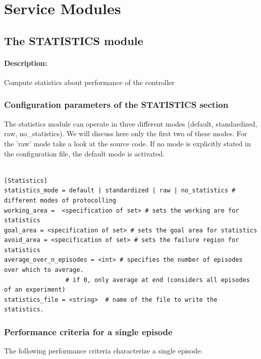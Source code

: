\documentclass[a4paper,12pt,german]{article}
\begin{document}
\section{Service Modules}

\subsection{The STATISTICS module}

\paragraph{Description:} Compute statistics about performance of the controller

\subsubsection{Configuration parameters of the STATISTICS section}
The statistics module can operate in three different modes (default, standardized, raw, no\_statistics).
We will discuss here only the first two of these modes. For the 'raw' mode take a look at the source code.
If no mode is explicitly stated in the configuration file, the default mode is activated.
\begin{footnotesize}
\begin{verbatim}

[Statistics]
statistics_mode = default | standardized | raw | no_statistics # different modes of protocolling
working_area =  <specification of set> # sets the working are for statistics
goal_area = <specification of set> # sets the goal area for statistics
avoid_area = <specification of set> # sets the failure region for statistics
average_over_n_episodes = <int> # specifies the number of episodes over which to average. 
			     # if 0, only average at end (considers all episodes of an experiment)
statistics_file = <string>  # name of the file to write the statistics.

\end{verbatim}
\end{footnotesize}


\subsubsection{Performance criteria for a single episode}

The following performance criteria characterize a single episode:
\end{document}

